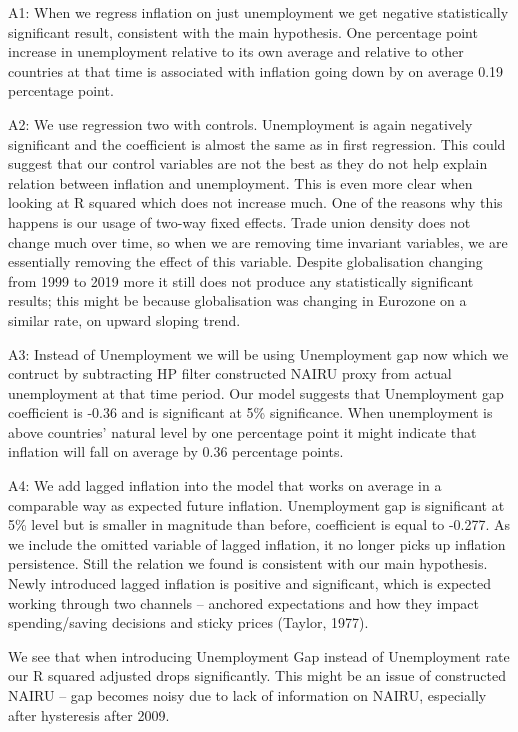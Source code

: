 \documentclass[preprint,10pt,authoryear]{elsarticle}
\begin{document}
A1: When we regress inflation on just unemployment we get negative statistically significant result, consistent with the main hypothesis. One percentage point increase in unemployment relative to its own average and relative to other countries at that time is associated with inflation going down by on average 0.19 percentage point. 

A2: We use regression two with controls. Unemployment is again negatively significant and the coefficient is almost the same as in first regression. This could suggest that our control variables are not the best as they do not help explain relation between inflation and unemployment. This is even more clear when looking at R squared which does not increase much. One of the reasons why this happens is our usage of two-way fixed effects. Trade union density does not change much over time, so when we are removing time invariant variables, we are essentially removing the effect of this variable. Despite globalisation changing from 1999 to 2019 more it still does not produce any statistically significant results; this  might be because globalisation was changing in Eurozone on a similar rate, on upward sloping trend. 

A3: Instead of Unemployment we will be using Unemployment gap now which we contruct by subtracting HP filter constructed NAIRU proxy from actual unemployment at that time period. Our model suggests that Unemployment gap coefficient is -0.36 and is significant at 5\% significance. When unemployment is above countries’ natural level by one percentage point it might indicate that inflation will fall on average by 0.36 percentage points. 

A4: We add lagged inflation into the model that works on average in a comparable way as expected future inflation. Unemployment gap is significant at 5\% level but is smaller in magnitude than before, coefficient is equal to -0.277. As we include the omitted variable of lagged inflation, it no longer picks up inflation persistence. Still the relation we found is consistent with our main hypothesis. Newly introduced lagged inflation is positive and significant, which is expected working through two channels – anchored expectations and how they impact spending/saving decisions and sticky prices (Taylor, 1977).  

We see that when introducing Unemployment Gap instead of Unemployment rate our R squared adjusted drops significantly. This might be an issue of constructed NAIRU – gap becomes noisy due to lack of information on NAIRU, especially after hysteresis after 2009.  
\end{document}
